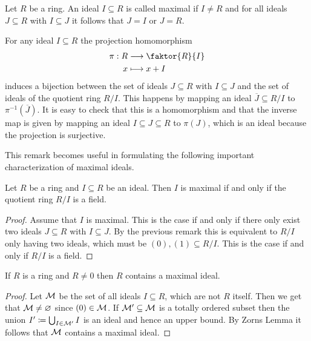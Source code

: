 \documentclass[../notes.tex]{subfiles}
\begin{document}
\begin{defi}{}{}
  Let $R$ be a ring. An ideal $I \subseteq R$ is called maximal if $I \neq R$ and for
  all ideals $J \subseteq R$ with $I \subseteq J$ it follows that $J = I$ or $J = R$.
\end{defi}

\begin{rem}{}{}
  For any ideal $I \subseteq R$ the projection homomorphism
  \begin{align*}
    \pi: R & \longrightarrow \faktor{R}{I} \\
    x & \longmapsto x + I
  \end{align*}
  induces a bijection between the set of ideals $J \subseteq R$ with $I \subseteq J$ and
  the set of ideals of the quotient ring $R/I$.
  This happens by mapping an ideal $\overline{J} \subseteq R/I$ to $\pi^{-1}(\overline{J})$.
  It is easy to check that this is a homomorphism and that the inverse map is given by
  mapping an ideal $I \subseteq J \subseteq R$ to $\pi(J)$, which is an ideal because
  the projection is surjective.
\end{rem}

\smallskip
\noindent
This remark becomes useful in formulating the following
important characterization of maximal ideals.

\smallskip
\begin{lemm}{}{}
  Let $R$ be a ring and $I \subseteq R$ be an ideal. Then $I$ is maximal if and only if
  the quotient ring $R/I$ is a field.
\end{lemm}

\begin{proof}
  Assume that $I$ is maximal. This is the case if and only if
  there only exist two ideals $J \subseteq R$
  with $I \subseteq J$. By the previous remark this is equivalent to
  $R/I$ only having two ideals, which must be $(0),(1) \subseteq R/I$. This is the
  case if and only if $R/I$ is a field.
\end{proof}

\begin{theo}{}{}
  If $R$ is a ring and $R \neq 0$ then $R$ contains a maximal ideal.
\end{theo}

\begin{proof}
  Let ${\mathcal{M}}$ be the set of all ideals $I \subseteq R$, which are not $R$ itself.
  Then we get that ${\mathcal{M}} \neq \varnothing$ since $(0) \in {\mathcal{M}}$. If ${\mathcal{M}}' \subseteq {\mathcal{M}}$
  is a totally ordered subset then the union $I' \coloneqq \bigcup_{I \in {\mathcal{M}}'} I$
  is an ideal and hence an upper bound. By Zorns Lemma it follows that ${\mathcal{M}}$ contains
  a maximal ideal.
  
\end{proof}
\end{document}
